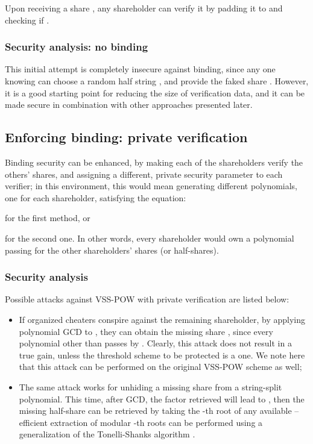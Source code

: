 \documentclass[10pt,journal,cspaper,compsoc]{IEEEtran}
\begin{document}
Upon receiving a share , any shareholder can verify it by padding it to  and checking if .\\


\subsubsection{Security analysis: no binding}
This initial attempt is completely insecure against binding, since any one knowing  can choose a random half string , and provide the faked share . However, it is a good starting point for reducing the size of verification data, and it can be made secure in combination with other approaches presented later.

\subsection{Enforcing binding: private verification}

Binding security can be enhanced, by making each of the  shareholders verify the others' shares, and assigning a different, private security parameter  to each verifier; in this environment, this would mean generating  different polynomials, one for each shareholder, satisfying the equation:

for the first method, or

for the second one. In other words, every shareholder would own a polynomial passing for the other shareholders' shares (or half-shares).

\subsubsection{Security analysis}
Possible attacks against VSS-POW with private verification are listed below:

\begin{itemize}
\item If  organized cheaters conspire against the remaining shareholder, by applying polynomial GCD to , they can obtain the missing share , since every polynomial other than  passes by . Clearly, this attack does not result in a true gain, unless the threshold scheme to be protected is a  one. We note here that this attack can be performed on the original VSS-POW scheme as well;
\item The same attack works for unhiding a missing share from a string-split polynomial. This time, after GCD, the factor retrieved will lead to , then the missing half-share can be retrieved by taking the -th root of any available  -- efficient extraction of modular -th roots can be performed using a generalization of the Tonelli-Shanks algorithm \cite{conf/focs/AdlemanMM77}.
\end{itemize}
\end{document}
